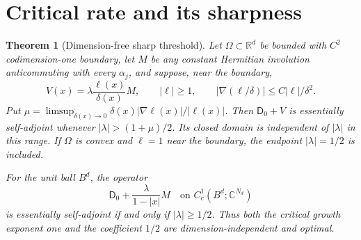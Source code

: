 \documentclass[11pt]{article}
\newtheorem{theorem}{Theorem}
\newcommand{\C}{\mathbb C}
\newcommand{\R}{\mathbb R}
\newcommand{\Dzero}{\mathsf D_0}
\begin{document}
\section{Critical rate and its sharpness}

\begin{theorem}[Dimension-free sharp threshold]\label{thm:critical}
Let $\Omega\subset\R^d$ be bounded with $C^2$ codimension-one boundary, let
$M$ be any constant Hermitian involution anticommuting with every $\alpha_j$,
and suppose, near the boundary,
\[
 V(x)=\lambda\frac{\ell(x)}{\delta(x)}M,
 \qquad |\ell|\geq1,
 \qquad |\nabla(\ell/\delta)|\leq C|\ell|/\delta^2.
\]
Put
$\mu=\limsup_{\delta(x)\to0}\delta(x)|\nabla\ell(x)|/|\ell(x)|$.
Then $\Dzero+V$ is essentially self-adjoint whenever
$|\lambda|>(1+\mu)/2$.  Its closed domain is independent of $|\lambda|$ in
this range.  If $\Omega$ is convex and $\ell=1$ near the boundary, the endpoint
$|\lambda|=1/2$ is included.

For the unit ball $B^d$, the operator
\[
 \Dzero+\frac{\lambda}{1-|x|}M
 \quad\text{on }C_c^1(B^d;\C^{N_d})
\]
is essentially self-adjoint if and only if $|\lambda|\geq1/2$.
Thus both the critical growth exponent one and the coefficient $1/2$ are
dimension-independent and optimal.
\end{theorem}
\end{document}
